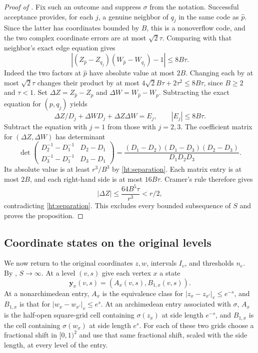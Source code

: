 \begin{proof}[Proof of ]
Fix such an outcome and suppress $\sigma$ from the notation.
Successful acceptance provides, for each $j$, a genuine neighbor of
$q_j$ in the same code as $\widehat p$. Since the latter has coordinates
bounded by $B$, this is a nonoverflow code, and the two complex coordinate
errors are at most $\sqrt2\tau$. Comparing with that neighbor's exact
edge equation gives
\[
 |(Z_{\widehat p}-Z_{q_j})(W_{\widehat p}-W_{q_j})-1|
       \le8B\tau.
\]
Indeed the two factors at $\widehat p$ have absolute value at most
$2B$. Changing each by at most $\sqrt2\tau$ changes their product
by at most $4\sqrt2 B\tau+2\tau^2\le8B\tau$, since $B\ge2$ and
$\tau<1$.
Set $\Delta Z=Z_{\widehat p}-Z_p$ and
$\Delta W=W_{\widehat p}-W_p$. Subtracting the exact equation for
$(p,q_j)$ yields
\[
 \Delta Z/D_j+\Delta W D_j+\Delta Z\Delta W=E_j,
       \qquad |E_j|\le8B\tau.
\]
Subtract the equation with $j=1$ from those with $j=2,3$.
The coefficient matrix for $(\Delta Z,\Delta W)$ has determinant
\begin{equation}\label{ht:determinant}
 \det\begin{pmatrix}
   D_2^{-1}-D_1^{-1}&D_2-D_1\\
   D_3^{-1}-D_1^{-1}&D_3-D_1
 \end{pmatrix}
 =\frac{(D_1-D_2)(D_1-D_3)(D_2-D_3)}{D_1D_2D_3}.
\end{equation}
Its absolute value is at least $r^3/B^3$ by
\eqref{ht:separation}. Each matrix entry is at most $2B$, and each
right-hand side is at most $16B\tau$. Cramer's rule therefore gives
\[
 |\Delta Z|\le\frac{64B^5\tau}{r^3}<r/2,
\]
contradicting \eqref{ht:separation}. This excludes every bounded
subsequence of $S$ and proves the proposition.
\end{proof}

\subsection{Coordinate states on the original levels}

We now return to the original coordinates $z,w$, intervals $I_v$, and
thresholds $n_e$. By , $S\to\infty$.
At a level $(v,s)$ give each vertex $x$ a state
\[
 \mathbf y_x(v,s)=(A_x(v,s),B_{1,x}(v,s)).
\]
At a nonarchimedean entry, $A_x$ is the equivalence class for
$|z_x-z_{x'}|_v\le e^{-s}$, and $B_{1,x}$ is that for
$|w_x-w_{x'}|_v\le e^s$. At an archimedean entry associated with $\sigma$,
$A_x$ is the half-open square-grid cell containing $\sigma(z_x)$ at
side length $e^{-s}$, and $B_{1,x}$ is the cell containing $\sigma(w_x)$
at side length $e^s$. For each of these two grids choose a fractional
shift in $[0,1)^2$ and use that same fractional shift, scaled with the
side length, at every level of the entry.

